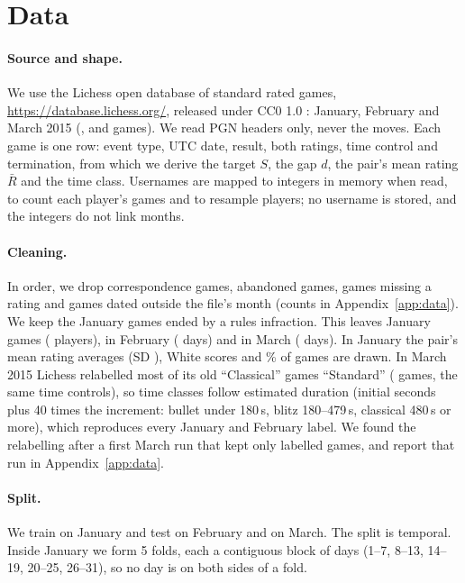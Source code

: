 \documentclass{article}
\begin{document}
\section{Data}

\paragraph{Source and shape.} We use the Lichess open database of standard rated games, \url{https://database.lichess.org/}, released under CC0 1.0 \citep{lichessdb}: January, February and March 2015 (\nRawJan{}, \nRawFeb{} and \nRawMar{} games). We read PGN headers only, never the moves. Each game is one row: event type, UTC date, result, both ratings, time control and termination, from which we derive the target $S$, the gap $d$, the pair's mean rating $\bar R$ and the time class. Usernames are mapped to integers in memory when read, to count each player's games and to resample players; no username is stored, and the integers do not link months.

\paragraph{Cleaning.} In order, we drop correspondence games, abandoned games, games missing a rating and games dated outside the file's month (counts in Appendix~\ref{app:data}). We keep the \nInfrJan{} January games ended by a rules infraction. This leaves \nGamesJan{} January games (\nPlayersJan{} players), \nGamesFeb{} in February (\nDaysFeb{} days) and \nGamesMar{} in March (\nDaysMar{} days). In January the pair's mean rating averages \ratingMean{} (SD \ratingSD), White scores \whiteScore{} and \drawRate\% of games are drawn. In March 2015 Lichess relabelled most of its old ``Classical'' games ``Standard'' (\nStandardMar{} games, the same time controls), so time classes follow estimated duration (initial seconds plus 40 times the increment: bullet under 180\,s, blitz 180--479\,s, classical 480\,s or more), which reproduces every January and February label. We found the relabelling after a first March run that kept only labelled games, and report that run in Appendix~\ref{app:data}.

\paragraph{Split.} We train on January and test on February and on March. The split is temporal. Inside January we form 5 folds, each a contiguous block of days (1--7, 8--13, 14--19, 20--25, 26--31), so no day is on both sides of a fold.
\end{document}
